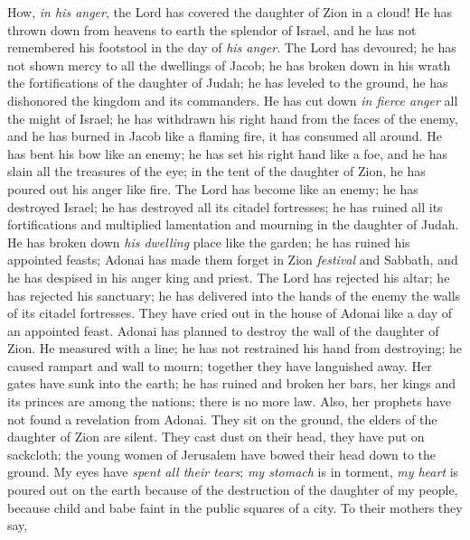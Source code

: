 \begin{biblechapter} %
 How, \textit{in his anger}, 
the Lord has covered the daughter of Zion in a cloud! 
He has thrown down from heavens to earth 
the splendor of Israel, 
and he has not remembered his footstool 
in the day of \textit{his anger}.
\verse The Lord has devoured; he has not shown mercy 
to all the dwellings of Jacob; 
he has broken down in his wrath 
the fortifications of the daughter of Judah; 
he has leveled to the ground, he has dishonored 
the kingdom and its commanders.
\verse He has cut down \textit{in fierce anger} 
all the might of Israel; 
he has withdrawn his right hand 
from the faces of the enemy, 
and he has burned in Jacob like a flaming fire, 
it has consumed all around.
\verse He has bent his bow like an enemy; 
he has set his right hand 
like a foe, and he has slain 
all the treasures of the eye; 
in the tent of the daughter of Zion, 
he has poured out his anger like fire.
\verse The Lord has become like an enemy; 
he has destroyed Israel; 
he has destroyed all its citadel fortresses; 
he has ruined all its fortifications 
and multiplied lamentation and mourning 
in the daughter of Judah.
\verse He has broken down \textit{his dwelling} place like the garden; 
he has ruined his appointed feasts; 
Adonai has made them forget in Zion 
\textit{festival} and Sabbath, 
and he has despised in his anger 
king and priest.
\verse The Lord has rejected his altar; 
he has rejected his sanctuary; 
he has delivered into the hands of the enemy 
the walls of its citadel fortresses. 
They have cried out in the house of Adonai 
like a day of an appointed feast.
\verse Adonai has planned to destroy 
the wall of the daughter of Zion. 
He measured with a line; he has not restrained 
his hand from destroying; 
he caused rampart and wall to mourn; 
together they have languished away.
\verse Her gates have sunk into the earth; 
he has ruined and broken her bars, 
her kings and its princes are among the nations; 
there is no more law. 
Also, her prophets have not found 
a revelation from Adonai.
\verse They sit on the ground, 
the elders of the daughter of Zion are silent. 
They cast dust on their head, 
they have put on sackcloth; 
the young women of Jerusalem 
have bowed their head down to the ground.
\verse My eyes have \textit{spent all their tears}; 
\textit{my stomach} is in torment, 
\textit{my heart} is poured out on the earth 
because of the destruction of the daughter of my people, 
because child and babe faint 
in the public squares of a city.
\verse To their mothers they say, 

\end{biblechapter}
